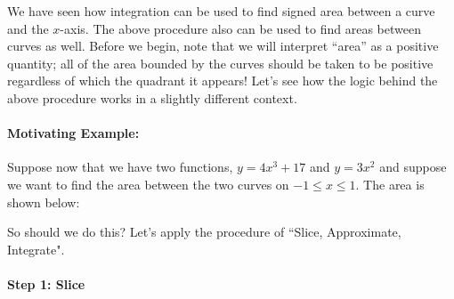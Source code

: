 \documentclass{ximera}
\begin{document}
We have seen how integration can be used to find signed area between a curve and the $x$-axis. The above procedure also can be used to find areas between curves as well.  Before we begin, note that we will interpret ``area'' as a positive quantity; all of the area bounded by the curves should be taken to be positive regardless of which the quadrant it appears! Let's see how the logic behind the above procedure works in a slightly different context.

\paragraph{Motivating Example:} Suppose now that we have two functions, $y=4x^3+17$ and $y=3x^2$ and suppose we want to find the area between the two curves on $-1 \leq x \leq 1$.  The area is shown below:






So should we do this? Let's apply the procedure of ``Slice, Approximate, Integrate".

\paragraph{Step 1: Slice}
\end{document}

